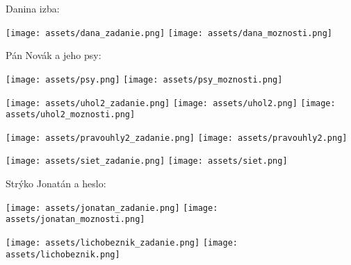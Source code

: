 \begin{example}
	Danina izba:
	
	\begin{center}
		\texttt{[image: assets/dana\_zadanie.png]}
		\texttt{[image: assets/dana\_moznosti.png]}
	\end{center}
\end{example}

\begin{example}
	Pán Novák a jeho psy:
	
	\begin{center}
		\texttt{[image: assets/psy.png]}
		\texttt{[image: assets/psy\_moznosti.png]}
	\end{center}
\end{example}

\begin{example}
	\begin{center}
		\texttt{[image: assets/uhol2\_zadanie.png]}
		\texttt{[image: assets/uhol2.png]}
		\texttt{[image: assets/uhol2\_moznosti.png]}
	\end{center}
\end{example}

\begin{example}
	\begin{center}
		\texttt{[image: assets/pravouhly2\_zadanie.png]}
		\texttt{[image: assets/pravouhly2.png]}
	\end{center}
\end{example}

 \begin{example}
 	\begin{center}
 		\texttt{[image: assets/siet\_zadanie.png]}
 		\texttt{[image: assets/siet.png]}
 	\end{center}
 \end{example}
 
 \begin{example}
 	Strýko Jonatán a heslo:
 	
 	\begin{center}
 		\texttt{[image: assets/jonatan\_zadanie.png]}
 		\texttt{[image: assets/jonatan\_moznosti.png]}
 	\end{center}
 \end{example}
 
 \begin{example}
 	\begin{center}
 		\texttt{[image: assets/lichobeznik\_zadanie.png]}
 		\texttt{[image: assets/lichobeznik.png]}
 	\end{center}
 \end{example}
 
